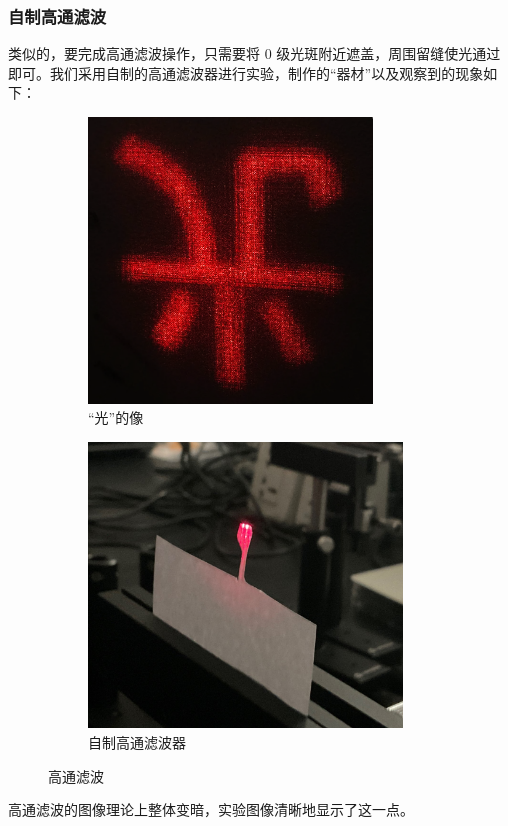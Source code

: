 \documentclass[UTF8]{article}
\theoremstyle{MyLineTheoremStyle} %
\theoremstyle{MyBlockTheoremStyle} %
\theoremstyle{MySubsubsectionStyle} %
\begin{document}
\subsubsection{自制高通滤波}

类似的，要完成高通滤波操作，只需要将 0 级光斑附近遮盖，周围留缝使光通过即可。我们采用自制的高通滤波器进行实验，制作的“器材”以及观察到的现象如下：

\begin{figure}[H]\centering
\begin{subfigure}[b]{0.5\columnwidth}\centering
    \includegraphics[height=215pt]{assets/1 阿贝尔/光 高通.png}
    \caption{“光”的像}
\end{subfigure}\hfill
\begin{subfigure}[b]{0.5\columnwidth}\centering
    \includegraphics[height=215pt]{assets/1 阿贝尔/自制高通滤波器.jpg}
    \caption{自制高通滤波器}
\end{subfigure}
\caption{高通滤波}
\end{figure}

高通滤波的图像理论上整体变暗，实验图像清晰地显示了这一点。
\end{document}

